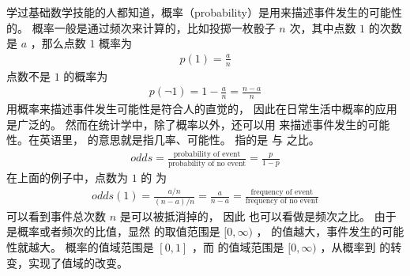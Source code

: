 \documentclass[letterpaper,10pt,english]{sphinxmanual}
\begin{document}
学过基础数学技能的人都知道，概率（probability）是用来描述事件发生的可能性的。
概率一般是通过频次来计算的，比如投掷一枚骰子 \(n\) 次，其中点数 \(1\) 的次数是 \(a\)
，那么点数 \(1\) 概率为
\begin{equation}\label{equation:二项模型/content:二项模型/content:17}
\begin{split}p(1)=\frac{a}{n}\end{split}
\end{equation}
点数不是 \(1\) 的概率为
\begin{equation}\label{equation:二项模型/content:二项模型/content:18}
\begin{split}p(\neg 1) = 1- \frac{a}{n} = \frac{n-a}{n}\end{split}
\end{equation}
用概率来描述事件发生可能性是符合人的直觉的，
因此在日常生活中概率的应用是广泛的。
然而在统计学中，除了概率以外，还可以用 
来描述事件发生的可能性。在英语里， 的意思就是指几率、可能性。
 指的是  与  之比。
\begin{equation}\label{equation:二项模型/content:二项模型/content:19}
\begin{split}odds = \frac{\text{probability of event}}{\text{probability of no event}}
= \frac{p}{1-p}\end{split}
\end{equation}
在上面的例子中，点数为 \(1\) 的 
为
\begin{equation}\label{equation:二项模型/content:二项模型/content:20}
\begin{split}odds(1)=\frac{a/n}{(n-a)/n} = \frac{a}{n-a}
=\frac{\text{frequency of event}}{\text{frequency of no event}}\end{split}
\end{equation}
可以看到事件总次数 \(n\) 是可以被抵消掉的，
因此  也可以看做是频次之比。
由于  是概率或者频次的比值，显然  的取值范围是
\([0,\infty)\)
， 的值越大，事件发生的可能性就越大。
概率的值域范围是 \([0,1]\)
，而  的值域范围是 \([0,\infty)\)
，从概率到  的转变，实现了值域的改变。
\end{document}
